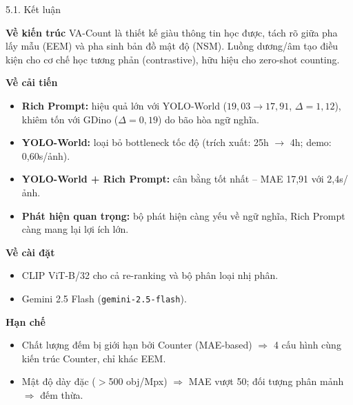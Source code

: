 \documentclass[11pt]{beamer}
\begin{document}
\begin{frame}[shrink=10]{5.1. Kết luận}
\scriptsize

\begin{block}{\textbf{Về kiến trúc}}
VA-Count là thiết kế giàu thông tin học được, tách rõ giữa pha lấy mẫu (EEM) và pha sinh bản đồ mật độ (NSM). Luồng dương/âm tạo điều kiện cho cơ chế học tương phản (contrastive), hữu hiệu cho zero-shot counting.
\end{block}

\begin{block}{\textbf{Về cải tiến}}
\begin{itemize}\setlength{\itemsep}{2pt}
  \item \textbf{Rich Prompt:} hiệu quả lớn với YOLO-World ($19{,}03 \to 17{,}91$, $\Delta=1{,}12$), khiêm tốn với GDino ($\Delta=0{,}19$) do bão hòa ngữ nghĩa.
  \item \textbf{YOLO-World:} loại bỏ bottleneck tốc độ (trích xuất: 25h $\to$ 4h; demo: 0,60s/ảnh).
  \item \textbf{YOLO-World + Rich Prompt:} cân bằng tốt nhất -- MAE 17,91 với 2,4s/ảnh.
  \item \textbf{Phát hiện quan trọng:} bộ phát hiện càng yếu về ngữ nghĩa, Rich Prompt càng mang lại lợi ích lớn.
\end{itemize}
\end{block}

\begin{block}{\textbf{Về cài đặt}}
\begin{itemize}\setlength{\itemsep}{1pt}
  \item CLIP ViT-B/32 cho cả re-ranking và bộ phân loại nhị phân.
  \item Gemini 2.5 Flash (\texttt{gemini-2.5-flash}).
\end{itemize}
\end{block}

\begin{block}{\textbf{Hạn chế}}
\begin{itemize}\setlength{\itemsep}{1pt}
  \item Chất lượng đếm bị giới hạn bởi Counter (MAE-based) $\Rightarrow$ 4 cấu hình cùng kiến trúc Counter, chỉ khác EEM.
  \item Mật độ dày đặc ($>$500 obj/Mpx) $\Rightarrow$ MAE vượt 50; đối tượng phân mảnh $\Rightarrow$ đếm thừa.
  
\end{itemize}
\end{block}

\end{frame}
\end{document}
